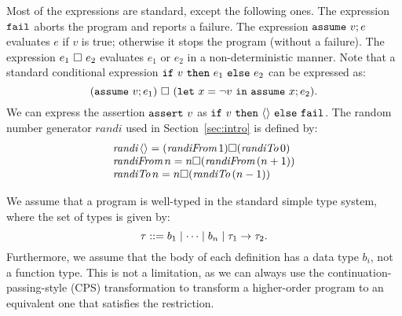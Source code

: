 Most of the expressions are standard, except the following ones. The 
expression \(\mathtt{fail}\) aborts the program and reports a failure. The 
expression \(\mathtt{assume~}v; e\) evaluates \(e\) if \(v\) is true; otherwise 
it stops the program (without a failure). The expression 
\(e_1\ \square\ e_2\) evaluates \(e_1\) or \(e_2\) in a non-deterministic 
manner. Note that a standard conditional expression 
\(\mathtt{if~}v\mathtt{~then~}e_1\mathtt{~else~}e_2\) can be expressed as: 
\[
 (\mathtt{assume~}v; e_1)\ \square\ (\mathtt{let~}x=\neg v\mathtt{~in~}\mathtt{assume~}x; e_2).
\]
%
We can express the assertion \(\mathtt{assert~}{v}\) as 
\(\mathtt{if~}v\mathtt{~then~}\langle{}\rangle\mathtt{~else~}\mathtt{fail}\).
%
The random number generator \(\textit{randi}\) used in 
Section~\ref{sec:intro} is defined by:
\[
\begin{array}{l}
\textit{randi}\,\langle{}\rangle = (\textit{randiFrom}\, 1)\square (\textit{randiTo}\, 0)\\
\textit{randiFrom}\,n = n\square (\textit{randiFrom}\,(n+1))\\
\textit{randiTo}\,n = n\square (\textit{randiTo}\,(n-1))\\
\end{array}
\]

We assume that a program is well-typed in the standard simple type 
system, where the set of types is given by:
\[ \tau ::= b_1 \mid \cdots \mid b_n \mid \tau_1\rightarrow \tau_2.\]
%
Furthermore, we assume that the body of each definition has a data type 
\(b_i\), not a function type. This is not a limitation, as we can always 
use the continuation-passing-style (CPS) transformation to transform a 
higher-order program to an equivalent one that satisfies the restriction.


